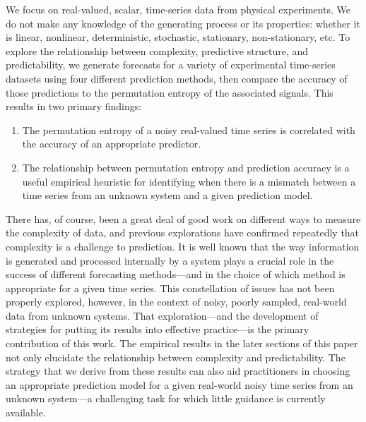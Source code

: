 We focus on real-valued, scalar, time-series data from physical experiments.
%
%
We do not make any knowledge of the generating process or its
properties: whether it is linear, nonlinear, deterministic,
stochastic, stationary, non-stationary, etc.  To explore the
relationship between complexity, predictive structure, and
predictability, we generate forecasts for a variety of experimental
time-series datasets using four different prediction methods, then
compare the accuracy of those predictions to the permutation entropy
of the associated signals.  This results in two primary findings:
% 
\begin{enumerate}

\item The permutation entropy of a noisy real-valued time series is
  correlated with the accuracy of an appropriate predictor.

\item The relationship between permutation entropy and prediction
  accuracy is a useful empirical heuristic for identifying when there
  is a mismatch between a time series from an unknown system and a
  given prediction model.
\end{enumerate}
% 
There has, of course, been a great deal of good work on different ways
to measure the complexity of data, and previous explorations have
confirmed repeatedly that complexity is a challenge to prediction.  It
is well known that the way information is generated and processed
internally by a system plays a crucial role in the success of
different forecasting methods---and in the choice of which method is
appropriate for a given time series.  
This constellation of issues has not been properly explored, however,
in the context of noisy, poorly sampled, real-world data from unknown
systems.  That exploration---and the development of strategies for
putting its results into effective practice---is the primary
contribution of this work.  The empirical results in the later
sections of this paper not only elucidate the relationship between
complexity and predictability.  The strategy that we derive from these
results can also aid practitioners in choosing an appropriate
prediction model for a given real-world noisy time series from an
unknown system---a challenging task for which little guidance is
currently available.


